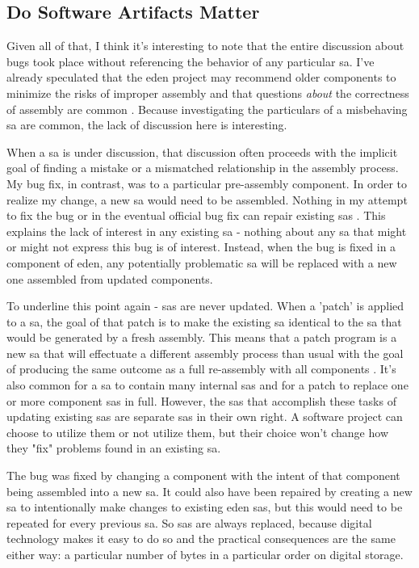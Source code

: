 \documentclass[a4paper,man,natbib,floatsintext]{apa6}
\begin{document}
   \subsection{Do Software Artifacts Matter}
   Given all of that, I think it's interesting to note that the entire discussion about bugs took place without referencing the behavior of any particular \gls{sa}. I've already speculated that the \acrshort{eden} project may recommend older components to minimize the risks of improper assembly and that questions \textit{about} the correctness of assembly are common \citep{Trendspotter2020-ps}. Because investigating the particulars of a misbehaving \gls{sa} are common, the lack of discussion here is interesting. 

   When a \gls{sa} is under discussion, that discussion often proceeds with the implicit goal of finding a mistake or a mismatched relationship in the assembly process. My bug fix, in contrast, was to a particular pre-assembly component. In order to realize my change, a new \gls{sa} would need to be assembled. Nothing in my attempt to fix the bug or in the eventual official bug fix can repair existing \glspl{sa} \citep{Konig2020-yx,Konig2020-ey}. This explains the lack of interest in any existing \gls{sa} - nothing about any \gls{sa} that might or might not express this bug is of interest. Instead, when the bug is fixed in a component of \acrshort{eden}, any potentially problematic \gls{sa} will be replaced with a new one assembled from updated components.

   To underline this point again - \glspl{sa} are never updated. When a 'patch' is applied to a \gls{sa}, the goal of that patch is to make the existing \gls{sa} identical to the \gls{sa} that would be generated by a fresh assembly. This means that a patch program is a new \gls{sa} that will effectuate a different assembly process than usual with the goal of producing the same outcome as a full re-assembly with all components \citep{Endsley_undated-iy}. It's also common for a \gls{sa} to contain many internal \glspl{sa} and for a patch to replace one or more component \glspl{sa} in full. However, the \glspl{sa} that accomplish these tasks of updating existing \glspl{sa} are separate \glspl{sa} in their own right. A software project can choose to utilize them or not utilize them, but their choice won't change how they "fix" problems found in an existing \gls{sa}. 

   The bug was fixed by changing a component with the intent of that component being assembled into a new \gls{sa}. It could also have been repaired by creating a new \gls{sa} to intentionally make changes to existing \acrshort{eden} \glspl{sa}, but this would need to be repeated for every previous \gls{sa}. So \glspl{sa} are always replaced, because digital technology makes it easy to do so and the practical consequences are the same either way: a particular number of bytes in a particular order on digital storage. 
\end{document}
